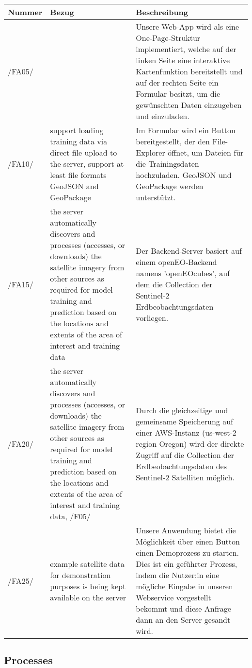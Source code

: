 \documentclass[a4paper,12pt]{article}
\newcommand{\addrow}[3]{#1 &#2 &#3 \\ [0.2cm]}
\newcommand{\addheading}[3]{#1 &#2 &#3\\ \hline }
\newcommand{\tabularhead}{\begin{tabular}{l p{5cm} p{8cm}}
\hline
}
\newenvironment{usecase}{\tabularhead}
{\hline\end{tabular}}
\begin{document}
\begin{usecase}

  \addheading{Nummer}{Bezug}{Beschreibung} 
  \addrow{/FA05/}{}{Unsere Web-App wird als eine One-Page-Struktur implementiert, welche auf der linken Seite eine interaktive Kartenfunktion bereitstellt und auf der rechten Seite ein Formular besitzt, um die gewünschten Daten einzugeben und einzuladen.} 
  \addrow{/FA10/}{support loading training data via direct file upload to the server, support at least file formats GeoJSON and GeoPackage}{Im Formular wird ein Button bereitgestellt, der den File-Explorer öffnet, um Dateien für die Trainingsdaten hochzuladen. GeoJSON und GeoPackage werden unterstützt.} 
  \addrow{/FA15/}{the server automatically discovers and processes (accesses, or downloads) the
satellite imagery from other sources as required for model training and prediction based on the locations and extents of the area of interest and training
data} {Der Backend-Server basiert auf einem openEO-Backend namens 'openEOcubes', auf dem die Collection der Sentinel-2 Erdbeobachtungsdaten vorliegen.}
  \addrow{/FA20/}{the server automatically discovers and processes (accesses, or downloads) the
satellite imagery from other sources as required for model training and prediction based on the locations and extents of the area of interest and training
data, /F05/}{Durch die gleichzeitige und gemeinsame Speicherung auf einer AWS-Instanz (us-west-2 region Oregon) wird der direkte Zugriff auf die Collection der Erdbeobachtungsdaten des Sentinel-2 Satelliten möglich.}
  \addrow{/FA25/}{example satellite data for demonstration purposes is being kept available on the
server}{Unsere Anwendung bietet die Möglichkeit über einen Button einen Demoprozess zu starten. Dies ist ein geführter Prozess, indem die Nutzer:in eine mögliche Eingabe in unseren Webservice vorgestellt bekommt und diese Anfrage dann an den Server gesandt wird.}

\end{usecase}

\subsection{Processes}
\end{document}
